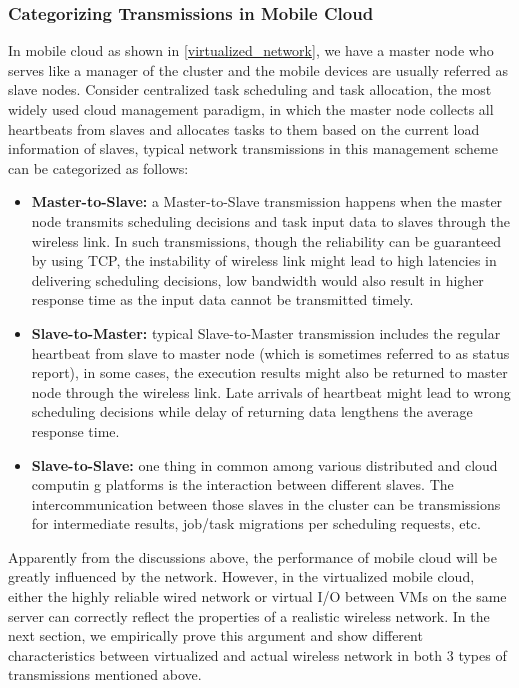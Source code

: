 \documentclass[journal,comsoc]{IEEEtran}
\begin{document}
\subsubsection{Categorizing Transmissions in Mobile Cloud}
In mobile cloud as shown in \ref{virtualized_network}, we have a master node who serves like a manager of the cluster and the mobile devices are usually referred as slave nodes. Consider centralized task scheduling and task allocation, the most widely used cloud management paradigm, in which the master node collects all heartbeats from slaves and allocates tasks to them based on the current load information of slaves, typical network transmissions in this management scheme can be categorized as follows:
\begin{itemize}
	\item {\bf Master-to-Slave: }a Master-to-Slave transmission happens when the master node transmits scheduling decisions and task input data to slaves through the wireless link. In such transmissions, though the reliability can be guaranteed by using TCP, the instability of wireless link might lead to high latencies in delivering scheduling decisions, low bandwidth would also result in higher response time as the input data cannot be transmitted timely.
	\item {\bf Slave-to-Master: }typical Slave-to-Master transmission includes the regular heartbeat from slave to master node (which is sometimes referred to as status report), in some cases, the execution results might also be returned to master node through the wireless link. Late arrivals of heartbeat might lead to wrong scheduling decisions while delay of returning data lengthens the average response time.
	\item {\bf Slave-to-Slave: }one thing in common among various distributed and cloud computin g platforms is the interaction between different slaves. The intercommunication between those slaves in the cluster can be transmissions for intermediate results, job/task migrations per scheduling requests, etc. 
\end{itemize}
Apparently from the discussions above, the performance of mobile cloud will be greatly influenced by the network. However, in the virtualized mobile cloud, either the highly reliable wired network or virtual I/O between VMs on the same server can correctly reflect the properties of a realistic wireless network. In the next section, we empirically prove this argument and show different characteristics between virtualized and actual wireless network in both 3 types of transmissions mentioned above.
\end{document}

